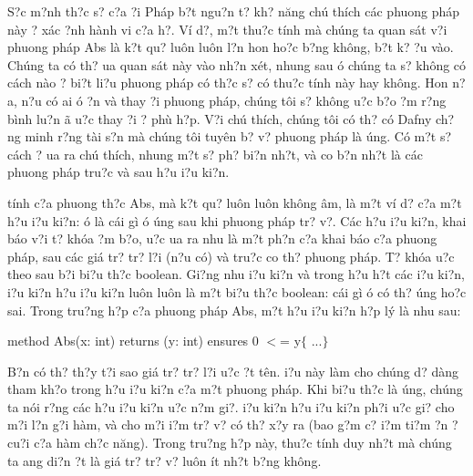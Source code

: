 \documentclass{article} %
\begin{document}
S?c m?nh th?c s? c?a {\DJ}?i Ph\'{a}p b?t ngu?n t? kh? n\u{a}ng ch\'{u} th\'{i}ch c\'{a}c phuong ph\'{a}p n\`{a}y {\dj}? x\'{a}c {\dj}?nh h\`{a}nh vi c?a h?. V\'{i} d?, m?t thu?c t\'{i}nh m\`{a} ch\'{u}ng ta quan s\'{a}t v?i phuong ph\'{a}p Abs l\`{a} k?t qu? lu\^{o}n lu\^{o}n l?n hon ho?c b?ng kh\^{o}ng, b?t k? {\dj}?u v\`{a}o. Ch\'{u}ng ta c\'{o} th? {\dj}ua quan s\'{a}t n\`{a}y v\`{a}o nh?n x\'{e}t, nhung sau {\dj}\'{o} ch\'{u}ng ta s? kh\^{o}ng c\'{o} c\'{a}ch n\`{a}o {\dj}? bi?t li?u phuong ph\'{a}p c\'{o} th?c s? c\'{o} thu?c t\'{i}nh n\`{a}y hay kh\^{o}ng. Hon n?a, n?u c\'{o} ai {\dj}\'{o} {\dj}?n v\`{a} thay {\dj}?i phuong ph\'{a}p, ch\'{u}ng t\^{o}i s? kh\^{o}ng {\dj}u?c b?o {\dj}?m r?ng b\`{i}nh lu?n {\dj}\~{a} {\dj}u?c thay {\dj}?i {\dj}? ph\`{u} h?p. V?i ch\'{u} th\'{i}ch, ch\'{u}ng t\^{o}i c\'{o} th? c\'{o} Dafny ch?ng minh r?ng t\`{a}i s?n m\`{a} ch\'{u}ng t\^{o}i tuy\^{e}n b? v? phuong ph\'{a}p l\`{a} {\dj}\'{u}ng. C\'{o} m?t s? c\'{a}ch {\dj}? {\dj}ua ra ch\'{u} th\'{i}ch, nhung m?t s? ph? bi?n nh?t, v\`{a} co b?n nh?t l\`{a} c\'{a}c phuong ph\'{a}p tru?c v\`{a} sau h?u {\dj}i?u ki?n.

   t\'{i}nh c?a phuong th?c Abs, m\`{a} k?t qu? lu\^{o}n lu\^{o}n kh\^{o}ng \^{a}m, l\`{a} m?t v\'{i} d? c?a m?t h?u {\dj}i?u ki?n: {\dj}\'{o} l\`{a} c\'{a}i g\`{i} {\dj}\'{o} {\dj}\'{u}ng sau khi phuong ph\'{a}p tr? v?. C\'{a}c h?u {\dj}i?u ki?n, khai b\'{a}o v?i t? kh\'{o}a {\dj}?m b?o, {\dj}u?c {\dj}ua ra nhu l\`{a} m?t ph?n c?a khai b\'{a}o c?a phuong ph\'{a}p, sau c\'{a}c gi\'{a} tr? tr? l?i (n?u c\'{o}) v\`{a} tru?c co th? phuong ph\'{a}p. T? kh\'{o}a {\dj}u?c theo sau b?i bi?u th?c boolean. Gi?ng nhu {\dj}i?u ki?n v\`{a} trong h?u h?t c\'{a}c {\dj}i?u ki?n, {\dj}i?u ki?n h?u {\dj}i?u ki?n lu\^{o}n lu\^{o}n l\`{a} m?t bi?u th?c boolean: c\'{a}i g\`{i} {\dj}\'{o} c\'{o} th? {\dj}\'{u}ng ho?c sai. Trong tru?ng h?p c?a phuong ph\'{a}p Abs, m?t h?u {\dj}i?u ki?n h?p l\'{y} l\`{a} nhu sau:

\noindent method Abs(x: int) returns (y: int)   ensures 0 $<$= y$\{$   ...$\}$

B?n c\'{o} th? th?y t?i sao gi\'{a} tr? tr? l?i {\dj}u?c {\dj}?t t\^{e}n. {\DJ}i?u n\`{a}y l\`{a}m cho ch\'{u}ng d? d\`{a}ng tham kh?o trong h?u {\dj}i?u ki?n c?a m?t phuong ph\'{a}p. Khi bi?u th?c l\`{a} {\dj}\'{u}ng, ch\'{u}ng ta n\'{o}i r?ng c\'{a}c h?u {\dj}i?u ki?n {\dj}u?c  n?m gi?. {\DJ}i?u ki?n h?u {\dj}i?u ki?n ph?i {\dj}u?c gi? cho m?i l?n g?i h\`{a}m, v\`{a} cho m?i {\dj}i?m tr? v? c\'{o} th? x?y ra (bao g?m c? {\dj}i?m ti?m ?n ? cu?i c?a h\`{a}m ch?c n\u{a}ng). Trong tru?ng h?p n\`{a}y, thu?c t\'{i}nh duy nh?t m\`{a} ch\'{u}ng ta {\dj}ang di?n {\dj}?t l\`{a} gi\'{a} tr? tr? v? lu\^{o}n \'{i}t nh?t b?ng kh\^{o}ng.
\end{document}
